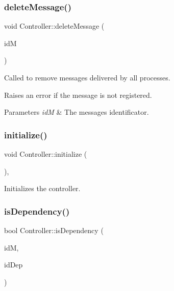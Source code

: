 \subsubsection{\texorpdfstring{delete\+Message()}{deleteMessage()}}
{\footnotesize\ttfamily void Controller\+::delete\+Message (\begin{DoxyParamCaption}\item[{\hyperlink{structures_8h_a83a1d9a070efa5341da84cfd8e28d3e5}{id\+Msg}}]{idM }\end{DoxyParamCaption})\hspace{0.3cm}{\ttfamily [private]}}



Called to remove messages delivered by all processes. 

Raises an error if the message is not registered. 
\begin{DoxyParams}{Parameters}
{\em idM} & The message\textquotesingle{}s identificator. \\
\hline
\end{DoxyParams}
\mbox{\label{class_controller_a28d5755bc8fed07cebd88f857f0f83df}} 
\subsubsection{\texorpdfstring{initialize()}{initialize()}}
{\footnotesize\ttfamily void Controller\+::initialize (\begin{DoxyParamCaption}{ }\end{DoxyParamCaption})\hspace{0.3cm}{\ttfamily [private]}, {\ttfamily [virtual]}}



Initializes the controller. 

\mbox{\label{class_controller_ad76a99df69bf99705dc18ba72b4b04c2}} 
\subsubsection{\texorpdfstring{is\+Dependency()}{isDependency()}}
{\footnotesize\ttfamily bool Controller\+::is\+Dependency (\begin{DoxyParamCaption}\item[{\hyperlink{structures_8h_a83a1d9a070efa5341da84cfd8e28d3e5}{id\+Msg}}]{idM,  }\item[{\hyperlink{structures_8h_a83a1d9a070efa5341da84cfd8e28d3e5}{id\+Msg}}]{id\+Dep }\end{DoxyParamCaption})}




